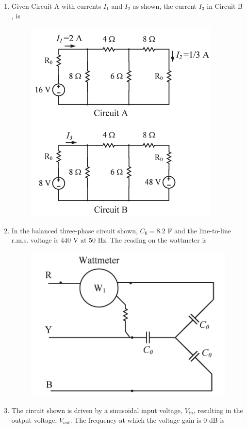 \documentclass[journal,12pt,onecolumn]{IEEEtran}
\theoremstyle{remark}
\begin{document}
\begin{enumerate}
\item Given Circuit A with currents $I_1$ and $I_2$ as shown, the current $I_3$ in Circuit B , is \underline{\hspace{2cm}}

\hfill{}

\begin{figure}[H]
\includegraphics[width = 0.6\columnwidth]{q54}
\caption*{}
\label{fig:q54}
\end{figure}

\item In the balanced three-phase circuit shown, $C_0 = 8.2$ \textmu F and the line-to-line r.m.s. voltage is $440$ V at $50$ Hz. The reading on the wattmeter  is \underline{\hspace{2cm}} 

\hfill{}
\begin{figure}[H]
\includegraphics[width = 0.5\columnwidth]{q55}
\caption*{}
\label{fig:q55}
\end{figure}

\item The circuit shown is driven by a sinusoidal input voltage, $V_{in}$, resulting in the output voltage, $V_{out}$. The frequency  at which the voltage gain is $0$ dB is \underline{\hspace{2cm}} 


\end{enumerate}
\end{document}

